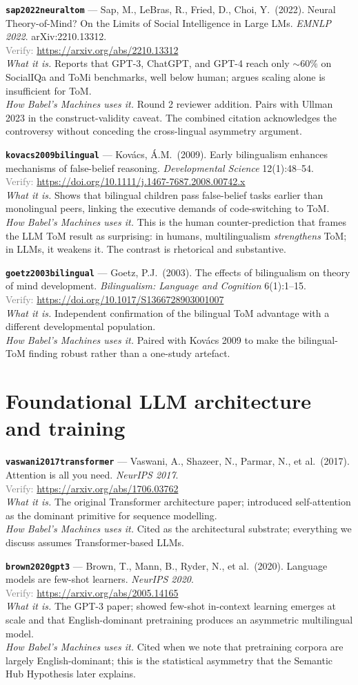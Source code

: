 \documentclass[11pt,a4paper]{article}
\newcommand{\entry}[5]{%
  \par\smallskip
  \noindent\textbf{\texttt{#1}} --- #2\\
  {\footnotesize \textcolor{gray}{Verify:} \url{#3}}\\
  \textit{What it is.} #4\\
  \textit{How Babel's Machines uses it.} #5
  \par\medskip
}
\begin{document}
\entry{sap2022neuraltom}
{Sap, M., LeBras, R., Fried, D., Choi, Y.\ (2022). Neural Theory-of-Mind? On the Limits of Social Intelligence in Large LMs. \emph{EMNLP 2022}. arXiv:2210.13312.}
{https://arxiv.org/abs/2210.13312}
{Reports that GPT-3, ChatGPT, and GPT-4 reach only $\sim 60\%$ on SocialIQa and ToMi benchmarks, well below human; argues scaling alone is insufficient for ToM.}
{Round 2 reviewer addition. Pairs with Ullman 2023 in the construct-validity caveat. The combined citation acknowledges the controversy without conceding the cross-lingual asymmetry argument.}

\entry{kovacs2009bilingual}
{Kov\'acs, \'A.M.\ (2009). Early bilingualism enhances mechanisms of false-belief reasoning. \emph{Developmental Science} 12(1):48--54.}
{https://doi.org/10.1111/j.1467-7687.2008.00742.x}
{Shows that bilingual children pass false-belief tasks earlier than monolingual peers, linking the executive demands of code-switching to ToM.}
{This is the human counter-prediction that frames the LLM ToM result as surprising: in humans, multilingualism \emph{strengthens} ToM; in LLMs, it weakens it. The contrast is rhetorical and substantive.}

\entry{goetz2003bilingual}
{Goetz, P.J.\ (2003). The effects of bilingualism on theory of mind development. \emph{Bilingualism: Language and Cognition} 6(1):1--15.}
{https://doi.org/10.1017/S1366728903001007}
{Independent confirmation of the bilingual ToM advantage with a different developmental population.}
{Paired with Kov\'acs 2009 to make the bilingual-ToM finding robust rather than a one-study artefact.}

\section{Foundational LLM architecture and training}

\entry{vaswani2017transformer}
{Vaswani, A., Shazeer, N., Parmar, N., et al.\ (2017). Attention is all you need. \emph{NeurIPS 2017}.}
{https://arxiv.org/abs/1706.03762}
{The original Transformer architecture paper; introduced self-attention as the dominant primitive for sequence modelling.}
{Cited as the architectural substrate; everything we discuss assumes Transformer-based LLMs.}

\entry{brown2020gpt3}
{Brown, T., Mann, B., Ryder, N., et al.\ (2020). Language models are few-shot learners. \emph{NeurIPS 2020}.}
{https://arxiv.org/abs/2005.14165}
{The GPT-3 paper; showed few-shot in-context learning emerges at scale and that English-dominant pretraining produces an asymmetric multilingual model.}
{Cited when we note that pretraining corpora are largely English-dominant; this is the statistical asymmetry that the Semantic Hub Hypothesis later explains.}
\end{document}
